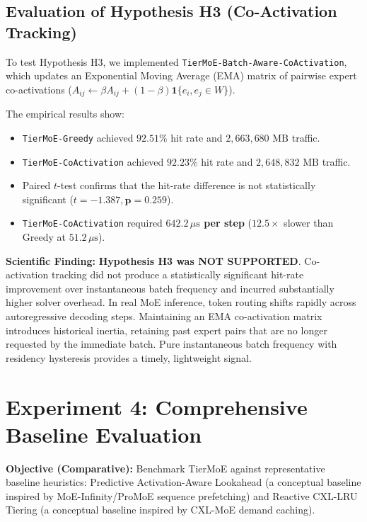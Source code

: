 \documentclass[10pt,journal,compsoc]{IEEEtran}
\begin{document}
\subsection{Evaluation of Hypothesis H3 (Co-Activation Tracking)}
To test Hypothesis H3, we implemented \texttt{TierMoE-Batch-Aware-CoActivation}, which updates an Exponential Moving Average (EMA) matrix of pairwise expert co-activations ($A_{ij} \leftarrow \beta A_{ij} + (1-\beta) \mathbf{1}\{e_i, e_j \in W\}$).

The empirical results show:
\begin{itemize}
    \item \texttt{TierMoE-Greedy} achieved $92.51\%$ hit rate and $2,663,680\text{ MB}$ traffic.
    \item \texttt{TierMoE-CoActivation} achieved $92.23\%$ hit rate and $2,648,832\text{ MB}$ traffic.
    \item Paired $t$-test confirms that the hit-rate difference is not statistically significant ($t = -1.387, \mathbf{p = 0.259}$).
    \item \texttt{TierMoE-CoActivation} required \textbf{$642.2\,\mu\text{s}$ per step} ($12.5\times$ slower than Greedy at $51.2\,\mu\text{s}$).
\end{itemize}

\textbf{Scientific Finding:} \textbf{Hypothesis H3 was NOT SUPPORTED}. Co-activation tracking did not produce a statistically significant hit-rate improvement over instantaneous batch frequency and incurred substantially higher solver overhead. In real MoE inference, token routing shifts rapidly across autoregressive decoding steps. Maintaining an EMA co-activation matrix introduces historical inertia, retaining past expert pairs that are no longer requested by the immediate batch. Pure instantaneous batch frequency with residency hysteresis provides a timely, lightweight signal.

\section{Experiment 4: Comprehensive Baseline Evaluation}
\label{sec:exp04}

\textbf{Objective (Comparative):} Benchmark TierMoE against representative baseline heuristics: Predictive Activation-Aware Lookahead (a conceptual baseline inspired by MoE-Infinity/ProMoE sequence prefetching) and Reactive CXL-LRU Tiering (a conceptual baseline inspired by CXL-MoE demand caching).
\end{document}
